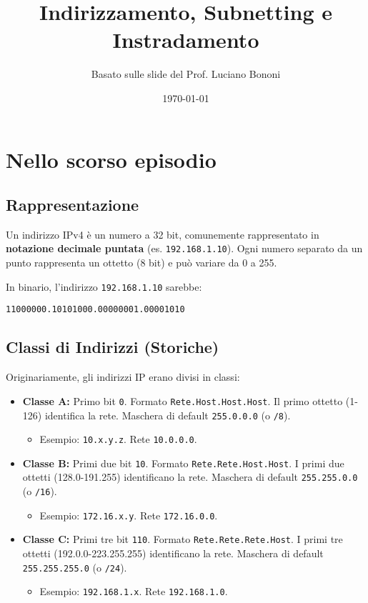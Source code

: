

\title{Indirizzamento, Subnetting e Instradamento}
\author{Basato sulle slide del Prof. Luciano Bononi}
\date{\today}



\maketitle
\tableofcontents
\newpage

\section{Nello scorso episodio}

\subsection{Rappresentazione}
Un indirizzo IPv4 è un numero a 32 bit, comunemente rappresentato in \textbf{notazione decimale puntata} (es. \texttt{192.168.1.10}). Ogni numero separato da un punto rappresenta un ottetto (8 bit) e può variare da 0 a 255.

In binario, l'indirizzo \texttt{192.168.1.10} sarebbe:
\begin{verbatim}
11000000.10101000.00000001.00001010
\end{verbatim}

\subsection{Classi di Indirizzi (Storiche)}
Originariamente, gli indirizzi IP erano divisi in classi:
\begin{itemize}
    \item \textbf{Classe A:} Primo bit \texttt{0}. Formato \texttt{Rete.Host.Host.Host}. Il primo ottetto (1-126) identifica la rete. Maschera di default \texttt{255.0.0.0} (o \texttt{/8}).
    \begin{itemize}
        \item Esempio: \texttt{10.x.y.z}. Rete \texttt{10.0.0.0}.
    \end{itemize}
    \item \textbf{Classe B:} Primi due bit \texttt{10}. Formato \texttt{Rete.Rete.Host.Host}. I primi due ottetti (128.0-191.255) identificano la rete. Maschera di default \texttt{255.255.0.0} (o \texttt{/16}).
    \begin{itemize}
        \item Esempio: \texttt{172.16.x.y}. Rete \texttt{172.16.0.0}.
    \end{itemize}
    \item \textbf{Classe C:} Primi tre bit \texttt{110}. Formato \texttt{Rete.Rete.Rete.Host}. I primi tre ottetti (192.0.0-223.255.255) identificano la rete. Maschera di default \texttt{255.255.255.0} (o \texttt{/24}).
    \begin{itemize}
        \item Esempio: \texttt{192.168.1.x}. Rete \texttt{192.168.1.0}.
    \end{itemize}
\end{itemize}


